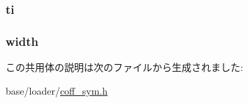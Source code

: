 \label{unionAUXU_a5922441bb6d02af2cb6d840862a40226}
\hypertarget{unionAUXU_a548accea0e00f2b327dc98585a2add5b}{
\subsubsection[{ti}]{ {\bf ti}}}
\label{unionAUXU_a548accea0e00f2b327dc98585a2add5b}
\hypertarget{unionAUXU_ad70eff56a66904a167767e8fcad8623c}{
\subsubsection[{width}]{ {\bf width}}}
\label{unionAUXU_ad70eff56a66904a167767e8fcad8623c}


この共用体の説明は次のファイルから生成されました:\begin{DoxyCompactItemize}
\item 
base/loader/\hyperlink{coff__sym_8h}{coff\_\-sym.h}\end{DoxyCompactItemize}
